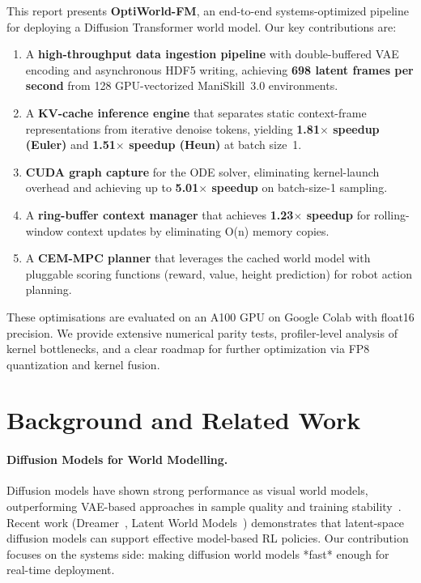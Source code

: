 \documentclass[letterpaper,twocolumn,10pt]{article}
\begin{document}
This report presents \textbf{OptiWorld-FM}, an end-to-end
systems-optimized pipeline for deploying a Diffusion Transformer world
model. Our key contributions are:

\begin{enumerate}
  \item A \textbf{high-throughput data ingestion pipeline} with
        double-buffered VAE encoding and asynchronous HDF5 writing,
        achieving \textbf{698 latent frames per second} from 128
        GPU-vectorized ManiSkill~3.0 environments.
  \item A \textbf{KV-cache inference engine} that separates static
        context-frame representations from iterative denoise tokens,
        yielding \textbf{1.81$\times$ speedup (Euler)} and
        \textbf{1.51$\times$ speedup (Heun)} at batch size~1.
  \item \textbf{CUDA graph capture} for the ODE solver, eliminating
        kernel-launch overhead and achieving up to \textbf{5.01$\times$
        speedup} on batch-size-1 sampling.
  \item A \textbf{ring-buffer context manager} that achieves
        \textbf{1.23$\times$ speedup} for rolling-window context updates
        by eliminating O(n) memory copies.
  \item A \textbf{CEM-MPC planner} that leverages the cached world
        model with pluggable scoring functions (reward, value, height
        prediction) for robot action planning.
\end{enumerate}

These optimisations are evaluated on an A100 GPU on Google Colab with float16 precision.  We provide extensive numerical parity tests, profiler-level analysis of kernel bottlenecks, and a clear roadmap for further optimization via FP8 quantization and kernel fusion.

\section{Background and Related Work}

\paragraph{Diffusion Models for World Modelling.}
Diffusion models have shown strong performance as visual world models, outperforming VAE-based approaches in sample quality and training stability~\cite{ho2020ddpm}.  Recent work (Dreamer~\cite{dreamer2020}, Latent World Models~\cite{unisim2021}) demonstrates that latent-space
diffusion models can support effective model-based RL policies. Our contribution focuses on the systems side: making diffusion world models *fast* enough for real-time deployment.
\end{document}
